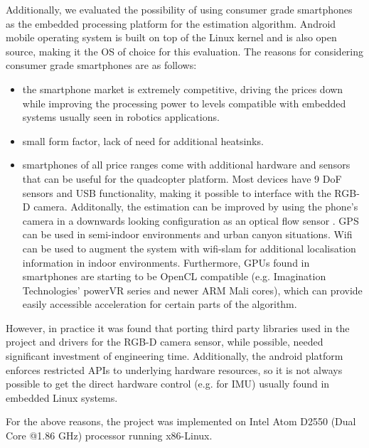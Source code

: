 \documentclass[]{article}
\begin{document}
{Additionally, we evaluated the possibility of using consumer grade smartphones as the embedded processing platform for the estimation algorithm. Android mobile operating system is built on top of the Linux kernel and is also open source, making it the OS of choice for this evaluation. The reasons for considering consumer grade smartphones are as follows:

\begin{itemize}
	\item the smartphone market is extremely competitive, driving the prices down while improving the processing power to levels compatible with embedded systems usually seen in robotics applications.
	\item small form factor, lack of need for additional heatsinks.
	\item smartphones of all price ranges come with additional hardware and sensors that can be useful for the quadcopter platform. Most devices have 9 DoF sensors and USB functionality, making it possible to interface with the RGB-D camera. Additonally, the estimation can be improved by using the phone's camera in a downwards looking configuration as an optical flow sensor \cite{DBLP:conf/icra/GrabeBG12}. GPS can be used in semi-indoor environments and urban canyon situations. Wifi can be used to augment the system with wifi-slam \cite{Wifi-slam} for additional localisation information in indoor environments. Furthermore, GPUs found in smartphones are starting to be OpenCL compatible (e.g. Imagination Technologies' powerVR series and newer ARM Mali cores), which can provide easily accessible acceleration for certain parts of the algorithm.
\end{itemize}

However, in practice it was found that porting third party libraries used in the project and drivers for the RGB-D camera sensor, while possible, needed significant investment of engineering time. Additionally, the android platform enforces restricted APIs to underlying hardware resources, so it is not always possible to get the direct hardware control (e.g. for IMU) usually found in embedded Linux systems.

For the above reasons, the project was implemented on Intel Atom D2550 (Dual Core @1.86 GHz) processor running x86-Linux. 


}
\end{document}
